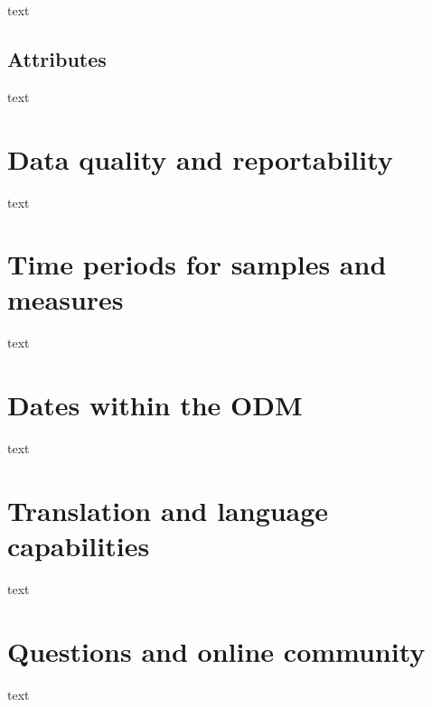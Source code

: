 \documentclass[
  letterpaper,
  DIV=11,
  numbers=noendperiod]{scrartcl}
\begin{document}
text

\hypertarget{attributes}{%
\subsection{Attributes}\label{attributes}}

text

\hypertarget{data-quality-and-reportability}{%
\section{Data quality and
reportability}\label{data-quality-and-reportability}}

text

\hypertarget{time-periods-for-samples-and-measures}{%
\section{Time periods for samples and
measures}\label{time-periods-for-samples-and-measures}}

text

\hypertarget{dates-within-the-odm}{%
\section{Dates within the ODM}\label{dates-within-the-odm}}

text

\hypertarget{translation-and-language-capabilities}{%
\section{Translation and language
capabilities}\label{translation-and-language-capabilities}}

text

\hypertarget{questions-and-online-community}{%
\section{Questions and online
community}\label{questions-and-online-community}}

text
\end{document}
